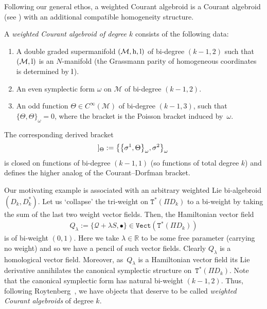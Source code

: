 \documentclass[10pt,a4paper]{amsart}
\newcommand{\Dleft}{[\hspace{-1.5pt}[}
\newcommand{\Dright}{]\hspace{-1.5pt}]}
\newcommand{\SN}[1]{\Dleft #1 \Dright}
\newcommand{\rmh}{\textnormal{h}}
\newcommand{\rml}{\textnormal{l}}
\def\Vect{\mathtt{Vect}}
\def\sT{{\mathtt T}}
\numberwithin{equation}{section}
\begin{document}
Following our general ethos,  a weighted Courant algebroid is a Courant algebroid (see  \cite{Courant:1990,Liu:1997}) with an additional compatible homogeneity structure.
\begin{Definition}
A \emph{weighted Courant algebroid of degree $k$} consists of the following data:
 \begin{enumerate}\itemsep=0pt
\item A double graded supermanifold $({\mathcal M},\rmh,\rml)$ of bi-degree $(k-1,2)$ such that $({\mathcal M}, \rml)$ is an $N$-manifold (the Grassmann parity of homogeneous coordinates is determined by $\rml$).
\item An even  symplectic form  $\omega$ on $\mathcal{M}$  of bi-degree $(k-1,2)$.
\item An odd function $\Theta \in C^{\infty}(\mathcal{M})$ of bi-degree $(k-1,3)$, such that $\{\Theta, \Theta \}_\omega =0$, where the bracket is the Poisson bracket induced by~$\omega$.
\end{enumerate}
 The corresponding derived bracket
\begin{gather*}
\SN{\sigma^{1}, \sigma^{2}}_\Theta :=  \big\{\big\{ \sigma^1, \Theta \big\}_\omega, \sigma^{2} \big\}_\omega
\end{gather*}
is closed on functions of bi-degree $(k-1,1)$ (so functions of total degree $k$) and def\/ines the higher analog of the Courant--Dorfman bracket.
\end{Definition}


Our motivating example is associated with an arbitrary  weighted Lie bi-algebroid $(D_{k},D_{k}^{*})$. Let us `collapse' the tri-weight on $\sT^{*}(\Pi D_{k})$ to a bi-weight by taking the sum of the last two weight vector f\/ields. Then, the Hamiltonian vector f\/ield
\begin{gather*}
Q_{\lambda} :=  \{ \mathcal{Q} + \lambda   S, \bullet  \} \in \Vect(\sT^{*}(\Pi D_{k}))
\end{gather*}
 is of bi-weight $(0,1)$.  Here we take $\lambda \in \mathbb{R}$ to be some free parameter (carrying no weight) and so we have a pencil of such vector f\/ields. Clearly $Q_{\lambda}$ is a homological vector f\/ield.  Moreover, as~$Q_{\lambda}$ is a Hamiltonian vector f\/ield its Lie derivative annihilates the canonical symplectic structure on~$\sT^{*}(\Pi D_{k})$.   Note that the canonical symplectic form has natural bi-weight $(k-1,2)$. Thus, following Roytenberg~\cite{Roytenberg:2001}, we have  objects  that deserve to be called \emph{weighted Courant algebroids} of degree $k$.
\end{document}

